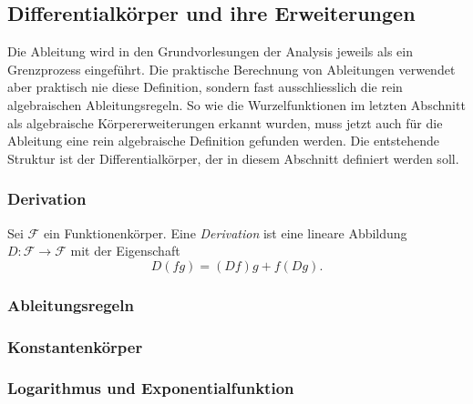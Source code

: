 %
%
%
\subsection{Differentialkörper und ihre Erweiterungen
\label{buch:integral:subsection:diffke}}
Die Ableitung wird in den Grundvorlesungen der Analysis jeweils
als ein Grenzprozess eingeführt.
Die praktische Berechnung von Ableitungen verwendet aber praktisch
nie diese Definition, sondern fast ausschliesslich die rein algebraischen
Ableitungsregeln.
So wie die Wurzelfunktionen im letzten Abschnitt als algebraische
Körpererweiterungen erkannt wurden, muss jetzt auch für die Ableitung
eine rein algebraische Definition gefunden werden.
Die entstehende Struktur ist der Differentialkörper, der in diesem
Abschnitt definiert werden soll.

%
%
\subsubsection{Derivation}

\begin{definition}
Sei $\mathscr{F}$ ein Funktionenkörper.
Eine {\em Derivation} ist eine lineare Abbildung
$D\colon \mathscr{F}\to\mathscr{F}$
mit der Eigenschaft
\[
D(fg) = (Df)g+f(Dg).
\]
\end{definition}

%
%
\subsubsection{Ableitungsregeln}

%
%
\subsubsection{Konstantenkörper}

%
%
\subsubsection{Logarithmus und Exponentialfunktion}

